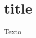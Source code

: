 \documentclass[./../main.tex]{subfiles}
\begin{document}
\section{title}

\frenchspacing
\onehalfspacing

\setlength{\parindent}{1em} %
\setlength{\parskip}{1em} %

Texto
\end{document}
